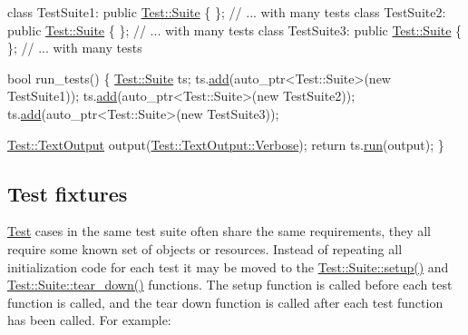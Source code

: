 \begin{DoxyCode}
\textcolor{keyword}{class }TestSuite1: \textcolor{keyword}{public} \hyperlink{class_test_1_1_suite}{Test::Suite} \{ \}; \textcolor{comment}{// ... with many tests}
\textcolor{keyword}{class }TestSuite2: \textcolor{keyword}{public} \hyperlink{class_test_1_1_suite}{Test::Suite} \{ \}; \textcolor{comment}{// ... with many tests}
\textcolor{keyword}{class }TestSuite3: \textcolor{keyword}{public} \hyperlink{class_test_1_1_suite}{Test::Suite} \{ \}; \textcolor{comment}{// ... with many tests}

\textcolor{keywordtype}{bool} run\_tests()
\{
    \hyperlink{class_test_1_1_suite}{Test::Suite} ts;
    ts.\hyperlink{class_test_1_1_suite_a0237b63fc694ecb133d023cf2d6ab271}{add}(auto\_ptr<Test::Suite>(\textcolor{keyword}{new} TestSuite1));
    ts.\hyperlink{class_test_1_1_suite_a0237b63fc694ecb133d023cf2d6ab271}{add}(auto\_ptr<Test::Suite>(\textcolor{keyword}{new} TestSuite2));
    ts.\hyperlink{class_test_1_1_suite_a0237b63fc694ecb133d023cf2d6ab271}{add}(auto\_ptr<Test::Suite>(\textcolor{keyword}{new} TestSuite3));
    
    \hyperlink{class_test_1_1_text_output}{Test::TextOutput} output(\hyperlink{class_test_1_1_text_output_ae7b22c9458e6c566996bf4517c73feb1a85dd6e42f6261a23fd504201f5cc2792}{Test::TextOutput::Verbose});
    \textcolor{keywordflow}{return} ts.\hyperlink{class_test_1_1_suite_ad17746e218da79c537bc9d21e389f570}{run}(output);
\}
\end{DoxyCode}
\hypertarget{tutorial_tutorial_test_fixtures}{}\subsection{Test fixtures}\label{tutorial_tutorial_test_fixtures}
\hyperlink{namespace_test}{Test} cases in the same test suite often share the same requirements, they all require some known set of objects or resources. Instead of repeating all initialization code for each test it may be moved to the \hyperlink{class_test_1_1_suite_afb4c733e6c46a011818bb02f2e8d5bb8}{Test\+::\+Suite\+::setup()} and \hyperlink{class_test_1_1_suite_a37d3595625cff09b8e43bf6c414ff610}{Test\+::\+Suite\+::tear\+\_\+down()} functions. The setup function is called before each test function is called, and the tear down function is called after each test function has been called. For example\+:


